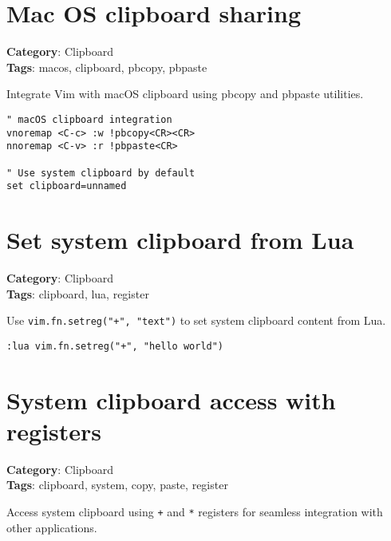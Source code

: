 {{{{\section{Mac OS clipboard sharing}

\textbf{Category}: Clipboard\\ \textbf{Tags}: macos, clipboard, pbcopy, pbpaste
\vspace{0.5cm}

Integrate Vim with macOS clipboard using pbcopy and pbpaste utilities.

\begin{Exa*}{}
\begin{Verbatim}[fontsize=\footnotesize, breaklines, breakanywhere]
" macOS clipboard integration
vnoremap <C-c> :w !pbcopy<CR><CR>
nnoremap <C-v> :r !pbpaste<CR>

" Use system clipboard by default
set clipboard=unnamed
\end{Verbatim}
\end{Exa*}

\section{Set system clipboard from Lua}

\textbf{Category}: Clipboard\\ \textbf{Tags}: clipboard, lua, register
\vspace{0.5cm}

Use {\footnotesize \Verb§vim.fn.setreg("+", "text")§} to set system clipboard content from Lua.

\begin{Exa*}{}
\begin{Verbatim}[fontsize=\footnotesize, breaklines, breakanywhere]
:lua vim.fn.setreg("+", "hello world")
\end{Verbatim}
\end{Exa*}

\section{System clipboard access with registers}

\textbf{Category}: Clipboard\\ \textbf{Tags}: clipboard, system, copy, paste, register
\vspace{0.5cm}

Access system clipboard using {\footnotesize \Verb§+§} and {\footnotesize \Verb§*§} registers for seamless integration with other applications.

}}}}
